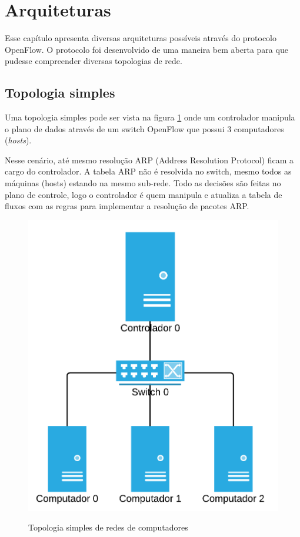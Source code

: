 \break
\section{Arquiteturas}

Esse capítulo apresenta diversas arquiteturas possíveis através do 
protocolo OpenFlow. 
O protocolo foi desenvolvido de uma maneira bem aberta para que pudesse 
compreender diversas topologias de rede. 

\subsection{Topologia simples}

Uma topologia simples pode ser vista na figura \ref{fig:simple-topology} onde
um controlador manipula o plano de dados através de um switch OpenFlow 
que possui 3 computadores (\emph{hosts}).

Nesse cenário, até mesmo resolução ARP (Address Resolution Protocol) ficam
a cargo do controlador. 
A tabela ARP não é resolvida no switch, mesmo todos as máquinas (hosts) 
estando na mesmo sub-rede. 
Todo as decisões são feitas no plano de controle, logo o controlador 
é quem manipula e atualiza a tabela de fluxos com as regras para 
implementar a resolução de pacotes ARP.

\begin{figure}[!h]
    \centering
    \includegraphics{img/simple-topology}
    \label{fig:simple-topology}
    \caption{Topologia simples de redes de computadores}
\end{figure}


